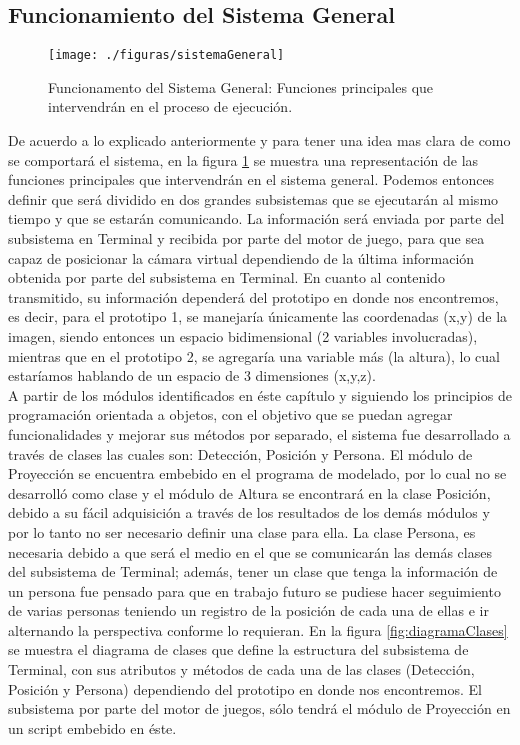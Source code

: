 \documentclass[a4paper,openright,12pt]{report}
\begin{document}
\subsection{Funcionamiento del Sistema General}
\begin{figure}[th]
	\centering
	\texttt{[image: ./figuras/sistemaGeneral]}
	\caption[Funcionamento del Sistema General]{Funcionamento del Sistema General: Funciones principales que intervendrán en el proceso de ejecución.} \label{fig:sistemaGeneral}
\end{figure}
De acuerdo a lo explicado anteriormente y para tener una idea mas clara de como se comportará el sistema, en la figura \ref{fig:sistemaGeneral} se muestra una representación de las funciones principales que intervendrán en el sistema general. Podemos entonces definir que será dividido en dos grandes subsistemas que se ejecutarán al mismo tiempo y que se estarán comunicando. La información será enviada por parte del subsistema en Terminal y recibida por parte del motor de juego, para que sea capaz de posicionar la cámara virtual dependiendo de la última información obtenida por parte del subsistema en Terminal. En cuanto al contenido transmitido, su información dependerá del prototipo en donde nos encontremos, es decir, para el prototipo 1, se manejaría únicamente las coordenadas (x,y) de la imagen, siendo entonces un espacio bidimensional (2 variables involucradas), mientras que en el prototipo 2, se agregaría una variable más (la altura), lo cual estaríamos hablando de un espacio de 3 dimensiones (x,y,z).\\
A partir de los módulos identificados en éste capítulo y siguiendo los principios de programación orientada a objetos, con el objetivo que se puedan agregar funcionalidades y mejorar sus métodos por separado, el sistema fue desarrollado a través de clases las cuales son: Detección, Posición y Persona. El módulo de Proyección se encuentra embebido en el programa de modelado, por lo cual no se desarrolló como clase y el módulo de Altura se encontrará en la clase Posición, debido a su fácil adquisición a través de los resultados de los demás módulos y por lo tanto no ser necesario definir una clase para ella. La clase Persona, es necesaria debido a que será el medio en el que se comunicarán las demás clases del subsistema de Terminal; además, tener un clase que tenga la información de un persona fue pensado para que en trabajo futuro se pudiese hacer seguimiento de varias personas teniendo un registro de la posición de cada una de ellas e ir alternando la perspectiva conforme lo requieran. En la figura \ref{fig:diagramaClases} se muestra el diagrama de clases que define la estructura del subsistema de Terminal, con sus atributos y métodos de cada una de las clases (Detección, Posición y Persona) dependiendo del prototipo en donde nos encontremos. El subsistema por parte del motor de juegos, sólo tendrá el módulo de Proyección en un script embebido en éste.\\
\end{document}
